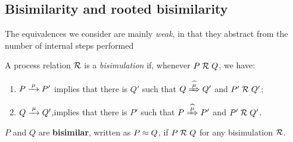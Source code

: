 \subsection{Bisimilarity and rooted bisimilarity}
\label{ss:BiEx}

The equivalences we consider are  mainly
 \emph{weak}, in that they
abstract from the number of internal steps performed
\begin{definition}%
\label{d:wb}
A process relation ${{\cal R}}$ 
 is a \emph{bisimulation} if, whenever
 $P\mathrel{\cal R} Q$, %
we have:
\begin{enumerate}
\item $P \arr\mu P'$ implies that there is $Q'$ such that $Q \Arcap \mu Q'$ and $P' \mathrel{\cal R} Q'$;\vspace{-4pt}
\item $Q \arr\mu Q'$,implies that there is $P'$ such that $P \Arcap
  \mu P'$ and $P' \mathrel{\cal R} Q'$.
\end{enumerate}  
 $P$ and $Q$ are \textbf{bisimilar},
written as $P \approx Q$, if $P \mathrel{\cal R} Q$ for any bisimulation ${\cal R}$.  
\end{definition} 

